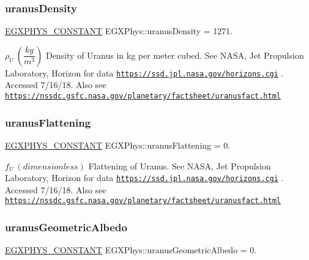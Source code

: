 \subsubsection{\texorpdfstring{uranus\+Density}{uranusDensity}}
{\footnotesize\ttfamily \mbox{\hyperlink{group___e_g_x_phys-_constants-_macros_ga76980d288494ce1714c9ac68a95ba702}{E\+G\+X\+P\+H\+Y\+S\+\_\+\+C\+O\+N\+S\+T\+A\+NT}} E\+G\+X\+Phys\+::uranus\+Density = 1271.}

$\rho_{U} \ (\dfrac{kg}{m^3})$ Density of Uranus in kg per meter cubed. See N\+A\+SA, Jet Propulsion Laboratory, Horizon for data \href{https://ssd.jpl.nasa.gov/horizons.cgi}{\tt https\+://ssd.\+jpl.\+nasa.\+gov/horizons.\+cgi} . Accessed 7/16/18. Also see \href{https://nssdc.gsfc.nasa.gov/planetary/factsheet/uranusfact.html}{\tt https\+://nssdc.\+gsfc.\+nasa.\+gov/planetary/factsheet/uranusfact.\+html} \mbox{\label{group___e_g_x_phys-_constants-_astrophysics-_solar_system-_uranus-_bulk_gae10777496d6d1804e98530f68dcbe150}} 
\subsubsection{\texorpdfstring{uranus\+Flattening}{uranusFlattening}}
{\footnotesize\ttfamily \mbox{\hyperlink{group___e_g_x_phys-_constants-_macros_ga76980d288494ce1714c9ac68a95ba702}{E\+G\+X\+P\+H\+Y\+S\+\_\+\+C\+O\+N\+S\+T\+A\+NT}} E\+G\+X\+Phys\+::uranus\+Flattening = 0.}

$f_{U} \ (dimensionless)$ Flattening of Uranus. See N\+A\+SA, Jet Propulsion Laboratory, Horizon for data \href{https://ssd.jpl.nasa.gov/horizons.cgi}{\tt https\+://ssd.\+jpl.\+nasa.\+gov/horizons.\+cgi} . Accessed 7/16/18. Also see \href{https://nssdc.gsfc.nasa.gov/planetary/factsheet/uranusfact.html}{\tt https\+://nssdc.\+gsfc.\+nasa.\+gov/planetary/factsheet/uranusfact.\+html} \mbox{\label{group___e_g_x_phys-_constants-_astrophysics-_solar_system-_uranus-_bulk_ga9a1cfdab26c38a850508aa9b1e2409a1}} 
\subsubsection{\texorpdfstring{uranus\+Geometric\+Albedo}{uranusGeometricAlbedo}}
{\footnotesize\ttfamily \mbox{\hyperlink{group___e_g_x_phys-_constants-_macros_ga76980d288494ce1714c9ac68a95ba702}{E\+G\+X\+P\+H\+Y\+S\+\_\+\+C\+O\+N\+S\+T\+A\+NT}} E\+G\+X\+Phys\+::uranus\+Geometric\+Albedo = 0.}

